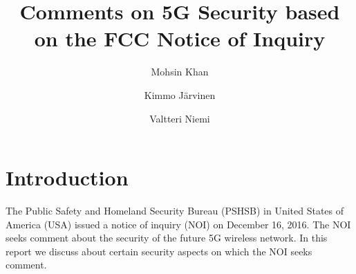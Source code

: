 \documentclass[12pt]{llncs}
\begin{document}
\mainmatter  %

\title{Comments on 5G Security based on the FCC Notice of Inquiry}


%
%
\author{Mohsin Khan%
\and Kimmo J\"arvinen
\and Valtteri Niemi}  %


%
%

\maketitle






\section{Introduction}
\label{intro} 
The Public Safety and Homeland Security Bureau (PSHSB) in United States of America (USA) issued a notice of inquiry (NOI) on December 16, 2016. The NOI seeks comment about the security of the future 5G wireless network. In this report we discuss about certain security aspects on which the NOI seeks comment.
\end{document}
